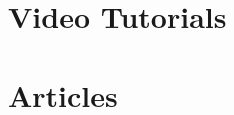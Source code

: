 \documentclass[letterpaper,11pt]{article}
\begin{document}
\section{Video Tutorials}
\begin{itemize}[leftmargin=0.15in, label={}]
    \small{\item{
                    
                    
                    
              }}
\end{itemize}

\section{Articles}
\begin{itemize}[leftmargin=0.15in, label={}]
    \small{\item{
                    
                    
                    
                    
                    
              }}
\end{itemize}
\end{document}
